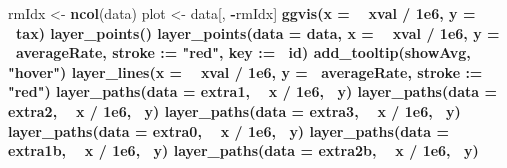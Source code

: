 \documentclass[]{article}
\newenvironment{Shaded}{\begin{snugshade}}{\end{snugshade}}
\newcommand{\DataTypeTok}[1]{\textcolor[rgb]{0.13,0.29,0.53}{#1}}
\newcommand{\ErrorTok}[1]{\textcolor[rgb]{0.64,0.00,0.00}{\textbf{#1}}}
\newcommand{\FloatTok}[1]{\textcolor[rgb]{0.00,0.00,0.81}{#1}}
\newcommand{\KeywordTok}[1]{\textcolor[rgb]{0.13,0.29,0.53}{\textbf{#1}}}
\newcommand{\NormalTok}[1]{#1}
\newcommand{\OperatorTok}[1]{\textcolor[rgb]{0.81,0.36,0.00}{\textbf{#1}}}
\newcommand{\StringTok}[1]{\textcolor[rgb]{0.31,0.60,0.02}{#1}}
\begin{document}
\begin{Shaded}
\begin{Highlighting}[]
{{\NormalTok{rmIdx <-}\StringTok{ }\KeywordTok{ncol}\NormalTok{(data)}
\NormalTok{plot <-}\StringTok{ }\NormalTok{data[, }\OperatorTok{-}\NormalTok{rmIdx] }\OperatorTok{%>%}
\StringTok{  }\KeywordTok{ggvis}\NormalTok{(}\DataTypeTok{x =} \OperatorTok{~}\StringTok{ }\NormalTok{xval }\OperatorTok{/}\StringTok{ }\FloatTok{1e6}\NormalTok{, }\DataTypeTok{y =} \OperatorTok{~}\NormalTok{tax) }\OperatorTok{%>%}
\StringTok{  }\KeywordTok{layer_points}\NormalTok{() }\OperatorTok{%>%}
\StringTok{  }\KeywordTok{layer_points}\NormalTok{(}\DataTypeTok{data =}\NormalTok{ data, }\DataTypeTok{x =} \OperatorTok{~}\StringTok{ }\NormalTok{xval }\OperatorTok{/}\StringTok{ }\FloatTok{1e6}\NormalTok{, }\DataTypeTok{y =} \OperatorTok{~}\NormalTok{averageRate, stroke }\OperatorTok{:}\ErrorTok{=}\StringTok{ "red"}\NormalTok{, key }\OperatorTok{:}\ErrorTok{=}\StringTok{ }\ErrorTok{~}\NormalTok{id) }\OperatorTok{%>%}
\StringTok{  }\KeywordTok{add_tooltip}\NormalTok{(showAvg, }\StringTok{"hover"}\NormalTok{) }\OperatorTok{%>%}
\StringTok{  }\KeywordTok{layer_lines}\NormalTok{(}\DataTypeTok{x =} \OperatorTok{~}\StringTok{ }\NormalTok{xval }\OperatorTok{/}\StringTok{ }\FloatTok{1e6}\NormalTok{, }\DataTypeTok{y =} \OperatorTok{~}\NormalTok{averageRate, stroke }\OperatorTok{:}\ErrorTok{=}\StringTok{ "red"}\NormalTok{) }\OperatorTok{%>%}
\StringTok{  }\KeywordTok{layer_paths}\NormalTok{(}\DataTypeTok{data =}\NormalTok{ extra1, }\OperatorTok{~}\StringTok{ }\NormalTok{x }\OperatorTok{/}\StringTok{ }\FloatTok{1e6}\NormalTok{, }\OperatorTok{~}\NormalTok{y) }\OperatorTok{%>%}
\StringTok{  }\KeywordTok{layer_paths}\NormalTok{(}\DataTypeTok{data =}\NormalTok{ extra2, }\OperatorTok{~}\StringTok{ }\NormalTok{x }\OperatorTok{/}\StringTok{ }\FloatTok{1e6}\NormalTok{, }\OperatorTok{~}\NormalTok{y) }\OperatorTok{%>%}
\StringTok{  }\KeywordTok{layer_paths}\NormalTok{(}\DataTypeTok{data =}\NormalTok{ extra3, }\OperatorTok{~}\StringTok{ }\NormalTok{x }\OperatorTok{/}\StringTok{ }\FloatTok{1e6}\NormalTok{, }\OperatorTok{~}\NormalTok{y) }\OperatorTok{%>%}
\StringTok{  }\KeywordTok{layer_paths}\NormalTok{(}\DataTypeTok{data =}\NormalTok{ extra0, }\OperatorTok{~}\StringTok{ }\NormalTok{x }\OperatorTok{/}\StringTok{ }\FloatTok{1e6}\NormalTok{, }\OperatorTok{~}\NormalTok{y) }\OperatorTok{%>%}
\StringTok{  }\KeywordTok{layer_paths}\NormalTok{(}\DataTypeTok{data =}\NormalTok{ extra1b, }\OperatorTok{~}\StringTok{ }\NormalTok{x }\OperatorTok{/}\StringTok{ }\FloatTok{1e6}\NormalTok{, }\OperatorTok{~}\NormalTok{y) }\OperatorTok{%>%}
\StringTok{  }\KeywordTok{layer_paths}\NormalTok{(}\DataTypeTok{data =}\NormalTok{ extra2b, }\OperatorTok{~}\StringTok{ }\NormalTok{x }\OperatorTok{/}\StringTok{ }\FloatTok{1e6}\NormalTok{, }\OperatorTok{~}\NormalTok{y) }\OperatorTok{%>%}
}}}}}}}}}}}}}}
\end{Highlighting}
\end{Shaded}
\end{document}
